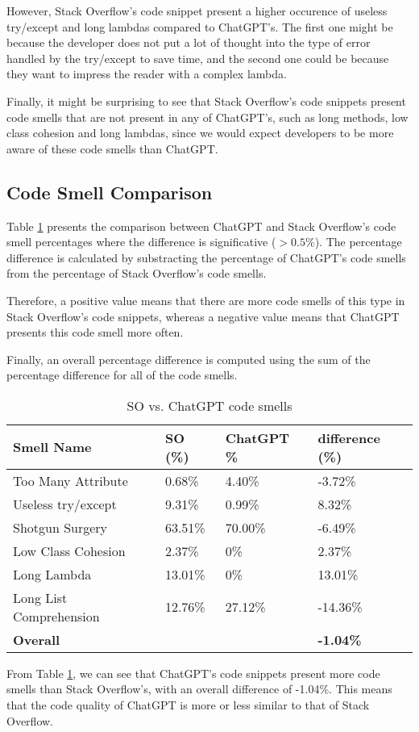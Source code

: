 However, Stack Overflow's code snippet present a higher occurence of useless try/except and long lambdas compared to ChatGPT's. The first one might be because the developer does not put a lot of thought into the type of error handled by the try/except to save time, and the second one could be because they want to impress the reader with a complex lambda.

Finally, it might be surprising to see that Stack Overflow's code snippets present code smells that are not present in any of ChatGPT's, such as long methods, low class cohesion and long lambdas, since we would expect developers to be more aware of these code smells than ChatGPT.

\subsection{Code Smell Comparison}
\label{sec:results-comparison}

Table \ref{table:result-comparison} presents the comparison between ChatGPT and Stack Overflow's code smell percentages where the difference is significative ($>0.5\%$). The percentage difference is calculated by substracting the percentage of ChatGPT's code smells from the percentage of Stack Overflow's code smells.

Therefore, a positive value means that there are more code smells of this type in Stack Overflow's code snippets, whereas a negative value means that ChatGPT presents this code smell more often.

Finally, an overall percentage difference is computed using the sum of the percentage difference for all of the code smells.

\begin{table}[!ht]
    \centering
    \caption{SO vs. ChatGPT code smells}
    \begin{tabular}{llll}
        \hline
        \textbf{Smell Name}     & \textbf{SO (\%)} & \textbf{ChatGPT \%} & \textbf{difference (\%)} \\ \hline
        Too Many Attribute      & 0.68\%           & 4.40\%              & -3.72\%                  \\
        Useless try/except      & 9.31\%           & 0.99\%              & 8.32\%                   \\
        Shotgun Surgery         & 63.51\%          & 70.00\%             & -6.49\%                  \\
        Low Class Cohesion      & 2.37\%           & 0\%                 & 2.37\%                   \\
        Long Lambda             & 13.01\%          & 0\%                 & 13.01\%                  \\
        Long List Comprehension & 12.76\%          & 27.12\%             & -14.36\%                 \\
        \textbf{Overall}        &                  & ~                   & \textbf{-1.04\%}         \\ \hline
    \end{tabular}
    \label{table:result-comparison}
\end{table}

From Table \ref{table:result-comparison}, we can see that ChatGPT's code snippets present more code smells than Stack Overflow's, with an overall difference of -1.04\%. This means that the code quality of ChatGPT is more or less similar to that of Stack Overflow.